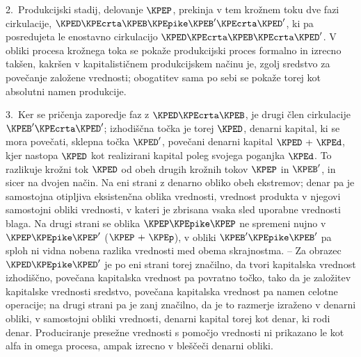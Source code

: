 \documentclass[kapital_02.tex]{subfiles}
\begin{document}
2.\ Produkcijski stadij, delovanje \(\KPEP\), prekinja v tem krožnem toku dve fazi cirkulacije, \(\KPED\KPEcrta\KPEB\KPEpike\KPEB'\KPEcrta\KPED'\), ki pa posredujeta le enostavno cirkulacijo \(\KPED\KPEcrta\KPEB\KPEcrta\KPED'\). V obliki procesa krožnega toka se pokaže produkcijski proces formalno in izrecno takšen, kakršen v kapitalističnem produkcijskem načinu \KPEstran je, zgolj sredstvo za povečanje založene vrednosti; obogatitev sama po sebi se pokaže torej kot absolutni namen produkcije.

3.\ Ker se pričenja zaporedje faz z \(\KPED\KPEcrta\KPEB\), je drugi člen cirkulacije \(\KPEB'\KPEcrta\KPED'\); izhodiščna točka je torej \(\KPED\), denarni kapital, ki se mora povečati, sklepna točka \(\KPED'\), povečani denarni kapital \(\KPED \textrm{ + } \KPEd\), kjer nastopa \(\KPED\) kot realizirani kapital poleg svojega poganjka \(\KPEd\). To razlikuje krožni tok \(\KPED\) od obeh drugih krožnih tokov \(\KPEP\) in \(\KPEB'\), in sicer na dvojen način. Na eni strani z denarno obliko obeh ekstremov; denar pa je samostojna otipljiva eksistenčna oblika vrednosti, vrednost produkta v njegovi samostojni obliki vrednosti, v kateri je zbrisana vsaka sled uporabne vrednosti blaga. Na drugi strani se oblika \(\KPEP\KPEpike\KPEP\) ne spremeni nujno v \(\KPEP\KPEpike\KPEP'\) (\(\KPEP \textrm{ + } \KPEp\)), v obliki \(\KPEB'\KPEpike\KPEB'\) pa sploh ni vidna nobena razlika vrednosti med obema skrajnostma. -- Za obrazec \(\KPED\KPEpike\KPED'\) je po eni strani torej značilno, da tvori kapitalska vrednost izhodiščno, povečana kapitalska vrednost pa povratno točko, tako da je založitev kapitalske vrednosti sredstvo, povečana kapitalska vrednost pa namen celotne operacije; na drugi strani pa je zanj značilno, da je to razmerje izraženo v denarni obliki, v samostojni obliki vrednosti, denarni kapital torej kot denar, ki rodi denar. Produciranje presežne vrednosti s pomočjo vrednosti ni prikazano le kot alfa in omega procesa, ampak izrecno v bleščeči denarni obliki.
\end{document}
